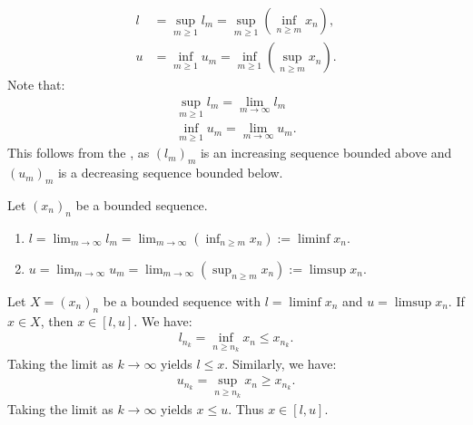 \begin{example}
\begin{equation*}
            \begin{split}
                l &= \sup_{m \geq 1}l_m = \sup_{m \geq 1}\left(\inf_{n \geq m}x_n\right), \\
                u &= \inf_{m \geq 1}u_m  = \inf_{m \geq 1}\left(\sup_{n \geq m}x_n\right). 
            \end{split}
            \end{equation*}
        Note that:
            \begin{equation*}
            \begin{split}
                \sup_{m \geq 1}l_m = \lim_{m \rightarrow \infty} l_m \\
                \inf_{m \geq 1}u_m = \lim_{m \rightarrow \infty} u_m.
            \end{split}
            \end{equation*}
        This follows from the , as $(l_m)_m$ is an increasing sequence bounded above and $(u_m)_m$ is a decreasing sequence bounded below.
    \end{example}

    \begin{definition}
        Let $(x_n)_n$ be a bounded sequence.
            \begin{enumerate}[label = (\arabic*)]
                \item $\displaystyle l = \lim_{m \rightarrow \infty} l_m = \lim_{m \rightarrow \infty}\left(\inf_{n \geq m}x_n\right) := \liminf x_n$.
                \item $\displaystyle u = \lim_{m \rightarrow \infty} u_m = \lim_{m \rightarrow \infty}\left(\sup_{n \geq m}x_n\right) := \limsup x_n$.
            \end{enumerate}
    \end{definition}

    \begin{proposition}
        Let $X = (x_n)_n$ be a bounded sequence with $l = \liminf x_n$ and $u = \limsup x_n$. If $x \in X$, then $x \in [l,u]$. We have:
            \begin{equation*}
            \begin{split}
                l_{n_k} = \inf_{n \geq n_k}x_n \leq x_{n_k}.
            \end{split}
            \end{equation*}
        Taking the limit as $k\rightarrow \infty$ yields $l \leq x$. Similarly, we have:
            \begin{equation*}
            \begin{split}
                u_{n_k} = \sup_{n \geq n_k}x_n \geq x_{n_k}.
            \end{split}
            \end{equation*}
        Taking the limit as $k \rightarrow \infty$ yields $x \leq u$. Thus $x \in [l,u]$.
    \end{proposition}

